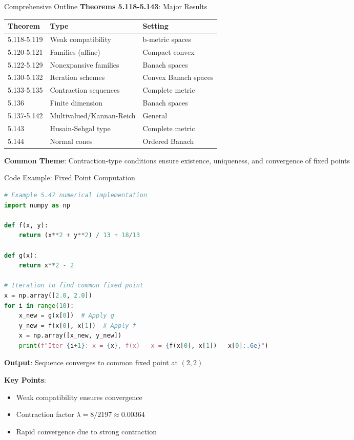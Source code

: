 \documentclass[aspectratio=169,10pt]{beamer}
\begin{document}
\begin{frame}{Comprehensive Outline}
    \textbf{Theorems 5.118-5.143}: Major Results

    \begin{tabular}{lll}
        \textbf{Theorem} & \textbf{Type} & \textbf{Setting} \\
        \hline
        5.118-5.119 & Weak compatibility & b-metric spaces \\
        5.120-5.121 & Families (affine) & Compact convex \\
        5.122-5.129 & Nonexpansive families & Banach spaces \\
        5.130-5.132 & Iteration schemes & Convex Banach spaces \\
        \hline
        5.133-5.135 & Contraction sequences & Complete metric \\
        5.136 & Finite dimension & Banach spaces \\
        5.137-5.142 & Multivalued/Kannan-Reich & General \\
        5.143 & Husain-Sehgal type & Complete metric \\
        \hline
        5.144 & Normal cones & Ordered Banach \\
    \end{tabular}

    \medskip

    \textbf{Common Theme}: Contraction-type conditions ensure existence, uniqueness, and convergence of fixed points
\end{frame}

\begin{frame}[fragile]{Code Example: Fixed Point Computation}
    \begin{lstlisting}[language=Python]
# Example 5.47 numerical implementation
import numpy as np

def f(x, y):
    return (x**2 + y**2) / 13 + 18/13

def g(x):
    return x**2 - 2

# Iteration to find common fixed point
x = np.array([2.0, 2.0])
for i in range(10):
    x_new = g(x[0])  # Apply g
    y_new = f(x[0], x[1])  # Apply f
    x = np.array([x_new, y_new])
    print(f"Iter {i+1}: x = {x}, f(x) - x = {f(x[0], x[1]) - x[0]:.6e}")
    \end{lstlisting}

    \medskip

    \textbf{Output}: Sequence converges to common fixed point at $(2, 2)$

    \medskip

    \textbf{Key Points}:
    \begin{itemize}
        \item Weak compatibility ensures convergence
        \item Contraction factor $\lambda = 8/2197 \approx 0.00364$
        \item Rapid convergence due to strong contraction
    \end{itemize}
\end{frame}
\end{document}
